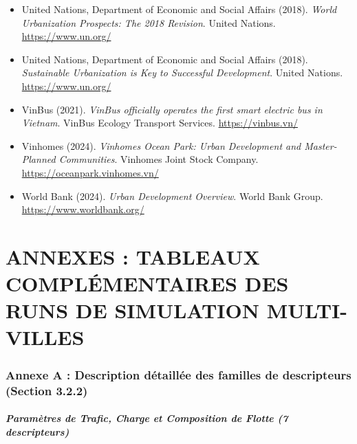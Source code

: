 \documentclass[10pt, a4paper]{article}
\begin{document}
\begin{itemize}
\item
  United Nations, Department of Economic and Social Affairs (2018).
  \emph{World Urbanization Prospects: The 2018 Revision}. United
  Nations. \url{https://www.un.org/}
\item
  United Nations, Department of Economic and Social Affairs (2018).
  \emph{Sustainable Urbanization is Key to Successful Development}.
  United Nations. \url{https://www.un.org/}
\item
  VinBus (2021). \emph{VinBus officially operates the first smart
  electric bus in Vietnam}. VinBus Ecology Transport Services.
  \url{https://vinbus.vn/}
\item
  Vinhomes (2024). \emph{Vinhomes Ocean Park: Urban Development and
  Master-Planned Communities}. Vinhomes Joint Stock Company.
  \url{https://oceanpark.vinhomes.vn/}
\item
  World Bank (2024). \emph{Urban Development Overview}. World Bank
  Group. \url{https://www.worldbank.org/}
\end{itemize}

\newpage

\section{ANNEXES : TABLEAUX COMPLÉMENTAIRES DES RUNS DE SIMULATION
MULTI-VILLES}\label{annexes-tableaux-compluxe9mentaires-des-runs-de-simulation-multi-villes}

\subsubsection{Annexe A : Description détaillée des familles de
descripteurs (Section
3.2.2)}\label{annexe-a-description-duxe9tailluxe9e-des-familles-de-descripteurs-section-3.2.2}

\subparagraph{Paramètres de Trafic, Charge et Composition de Flotte (7
descripteurs)}\label{paramuxe8tres-de-trafic-charge-et-composition-de-flotte-7-descripteurs-1}
\end{document}
